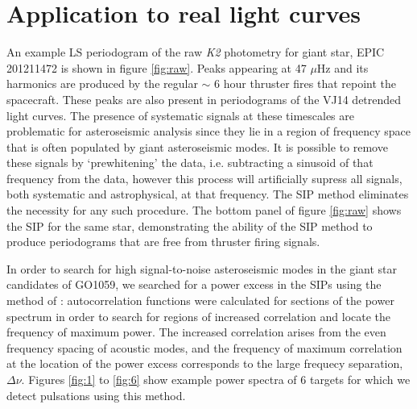 \documentclass[useAMS, usenatbib, preprint, 12pt]{aastex}
\begin{document}
\section{Application to real light curves}
\label{section:rotation}

An example LS periodogram of the raw {\it K2} photometry
for giant star, EPIC 201211472 is shown in figure \ref{fig:raw}.
Peaks appearing at 47 $\mu$Hz and its harmonics are produced by the regular
$\sim$ 6 hour thruster fires that repoint the spacecraft.
These peaks are also present in periodograms of the VJ14 detrended light
curves.
The presence of systematic signals at these timescales are problematic for
asteroseismic analysis since they lie in a region of frequency space
that is often populated by giant asteroseismic modes.
It is possible to remove these signals by `prewhitening' the data, i.e.
subtracting a sinusoid of that frequency from the data, however this process
will artificially supress all signals, both systematic and astrophysical, at
that frequency.
The SIP method eliminates the necessity for any such procedure.
The bottom panel of figure \ref{fig:raw} shows the SIP for the same star,
demonstrating the ability of the SIP method to produce periodograms that
are free from thruster firing signals.

In order to search for high signal-to-noise asteroseismic modes in the giant
star candidates of GO1059, we searched for a power excess in the SIPs using the
method of \citet{Huber2009}: autocorrelation functions were calculated for
sections of the power spectrum in order to search for regions of increased
correlation and locate the frequency of maximum power.
The increased correlation arises from the even frequency spacing of acoustic
modes, and the frequency of maximum correlation at the location of the power
excess corresponds to the large frequecy separation, $\Delta\nu$.
Figures \ref{fig:1} to \ref{fig:6} show example power spectra of 6 targets for
which we detect pulsations using this method.
\end{document}
